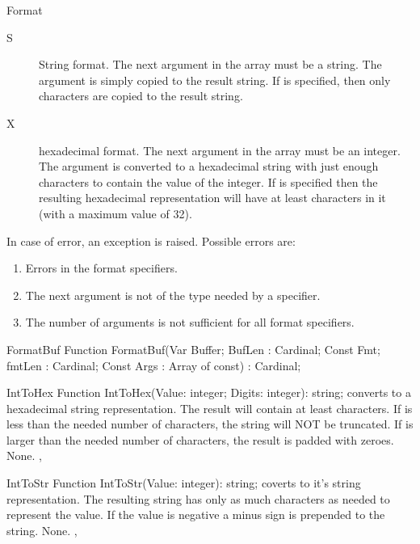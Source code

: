 \begin{function}{Format}
\begin{description}
\item[S] String format. The next argument in the  array must be
a string. The argument is simply copied to the result string. If
 is specified, then only  characters are
copied to the result string.

\item[X] hexadecimal format. The next argument in the  array must
be an integer. The argument is converted to a hexadecimal string with just
enough characters to contain the value of the integer. If 
is specified then the resulting hexadecimal representation will have at
least  characters in it (with a maximum value of 32).
\end{description}
\Errors
In case of error, an  exception is raised. Possible
errors are:
\begin{enumerate}
\item Errors in the format specifiers.
\item The next argument is not of the type needed by a specifier.
\item The number of arguments is not sufficient for all format specifiers.
\end{enumerate}
\SeeAlso
{}
\end{function}



\begin{function}{FormatBuf}
\Declaration
Function FormatBuf(Var Buffer; BufLen : Cardinal; Const Fmt; fmtLen : Cardinal; Const Args : Array of const) : Cardinal;
\Description
{}
\Errors
\SeeAlso
\end{function}



\begin{function}{IntToHex}
\Declaration
Function IntToHex(Value: integer; Digits: integer): string;
\Description
{} converts  to a hexadecimal string
representation. The result will contain at least 
characters. If  is less than the needed number of characters,
the string will NOT be truncated. If  is larger than the needed
number of characters, the result is padded with zeroes.
\Errors
None.
\SeeAlso
{}, 
\end{function}



\begin{function}{IntToStr}
\Declaration
Function IntToStr(Value: integer): string;
\Description
{} coverts  to it's string representation.
The resulting string has only as much characters as needed to represent
the value. If the value is negative a minus sign is prepended to the
string.
\Errors
None.
\SeeAlso
{}, 
\end{function}

